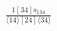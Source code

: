 \documentclass[varwidth, border=5pt]{standalone}
\begin{document}
\begin{my}
$\begin{gathered}
\scriptscriptstyle\frac{1[34]s_{134}}{⟨14⟩[24]⟨34⟩}
\end{gathered}$
\end{my}
\end{document}
